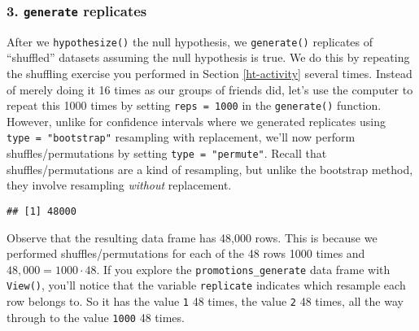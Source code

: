 \documentclass[
]{book}
\newenvironment{Shaded}{\begin{snugshade}}{\end{snugshade}}
\newcommand{\DataTypeTok}[1]{\textcolor[rgb]{0.13,0.29,0.53}{#1}}
\newcommand{\DecValTok}[1]{\textcolor[rgb]{0.00,0.00,0.81}{#1}}
\newcommand{\KeywordTok}[1]{\textcolor[rgb]{0.13,0.29,0.53}{\textbf{#1}}}
\newcommand{\NormalTok}[1]{#1}
\newcommand{\OperatorTok}[1]{\textcolor[rgb]{0.81,0.36,0.00}{\textbf{#1}}}
\newcommand{\StringTok}[1]{\textcolor[rgb]{0.31,0.60,0.02}{#1}}
\begin{document}
\hypertarget{generate-replicates}{%
\subsubsection*{\texorpdfstring{3. \texttt{generate} replicates}{3. generate replicates}}\label{generate-replicates}}

After we \texttt{hypothesize()} the null hypothesis, we \texttt{generate()} replicates of ``shuffled'' datasets assuming the null hypothesis is true. We do this by repeating the shuffling exercise you performed in Section \ref{ht-activity} several times. Instead of merely doing it 16 times as our groups of friends did, let's use the computer to repeat this 1000 times by setting \texttt{reps\ =\ 1000} in the \texttt{generate()}  function. However, unlike for confidence intervals where we generated replicates using \texttt{type\ =\ "bootstrap"} resampling with replacement, we'll now perform shuffles/permutations by setting \texttt{type\ =\ "permute"}. Recall that shuffles/permutations are a kind of resampling, but unlike the bootstrap method, they involve resampling \emph{without} replacement.

\begin{Shaded}
\end{Shaded}

\begin{verbatim}
## [1] 48000
\end{verbatim}

Observe that the resulting data frame has 48,000 rows. This is because we performed shuffles/permutations for each of the 48 rows 1000 times and \(48,000 = 1000 \cdot 48\). If you explore the \texttt{promotions\_generate} data frame with \texttt{View()}, you'll notice that the variable \texttt{replicate} indicates which resample each row belongs to. So it has the value \texttt{1} 48 times, the value \texttt{2} 48 times, all the way through to the value \texttt{1000} 48 times.
\end{document}
